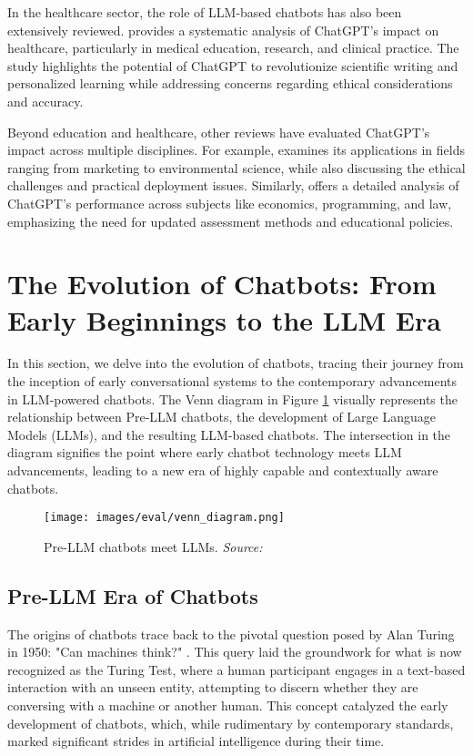 In the healthcare sector, the role of LLM-based chatbots has also been extensively reviewed. \cite{sallam2023chatgpt} provides a systematic analysis of ChatGPT's impact on healthcare, particularly in medical education, research, and clinical practice. The study highlights the potential of ChatGPT to revolutionize scientific writing and personalized learning while addressing concerns regarding ethical considerations and accuracy.

Beyond education and healthcare, other reviews have evaluated ChatGPT's impact across multiple disciplines. For example, \cite{kshetri2023so} examines its applications in fields ranging from marketing to environmental science, while also discussing the ethical challenges and practical deployment issues. Similarly, \cite{lo2023impact} offers a detailed analysis of ChatGPT's performance across subjects like economics, programming, and law, emphasizing the need for updated assessment methods and educational policies.

\section{The Evolution of Chatbots: From Early Beginnings to the LLM Era}

In this section, we delve into the evolution of chatbots, tracing their journey from the inception of early conversational systems to the contemporary advancements in LLM-powered chatbots. The Venn diagram in Figure \ref{fig:chatbot_venn_diagram} visually represents the relationship between Pre-LLM chatbots, the development of Large Language Models (LLMs), and the resulting LLM-based chatbots. The intersection in the diagram signifies the point where early chatbot technology meets LLM advancements, leading to a new era of highly capable and contextually aware chatbots.

\begin{figure}[h!]
    \centering
    \texttt{[image: images/eval/venn\_diagram.png]}
    \caption{Pre-LLM chatbots meet LLMs. \textit{Source:} \cite{dam2024complete}}
    \label{fig:chatbot_venn_diagram}
\end{figure}

\subsection{Pre-LLM Era of Chatbots}

The origins of chatbots trace back to the pivotal question posed by Alan Turing in 1950: "Can machines think?" \cite{turing2009computing}. This query laid the groundwork for what is now recognized as the Turing Test, where a human participant engages in a text-based interaction with an unseen entity, attempting to discern whether they are conversing with a machine or another human. This concept catalyzed the early development of chatbots, which, while rudimentary by contemporary standards, marked significant strides in artificial intelligence during their time.

